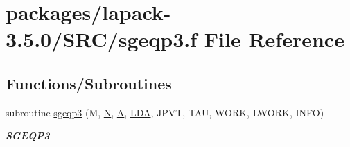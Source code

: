 \hypertarget{sgeqp3_8f}{}\section{packages/lapack-\/3.5.0/\+S\+R\+C/sgeqp3.f File Reference}
\label{sgeqp3_8f}
\subsection*{Functions/\+Subroutines}
\begin{DoxyCompactItemize}
\item 
subroutine \hyperlink{group__realGEcomputational_ga63f9e3af96fa42609e41bf3d77660bdf}{sgeqp3} (M, \hyperlink{polmisc_8c_a0240ac851181b84ac374872dc5434ee4}{N}, \hyperlink{classA}{A}, \hyperlink{example__user_8c_ae946da542ce0db94dced19b2ecefd1aa}{L\+D\+A}, J\+P\+V\+T, T\+A\+U, W\+O\+R\+K, L\+W\+O\+R\+K, I\+N\+F\+O)
\begin{DoxyCompactList}\small\item\em {\bfseries S\+G\+E\+Q\+P3} \end{DoxyCompactList}\end{DoxyCompactItemize}
